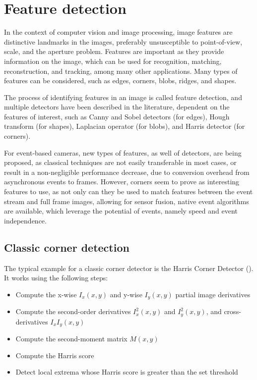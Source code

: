 \section{Feature detection}
\label{sec:sec2_feature_detection}

In the context of computer vision and image processing, image features are distinctive landmarks in the images, preferably unsusceptible to point-of-view, scale, and the aperture problem. Features are important as they provide information on the image, which can be used for recognition, matching, reconstruction, and tracking, among many other applications. Many types of features can be considered, such as edges, corners, blobs, ridges, and shapes.

The process of identifying features in an image is called feature detection, and multiple detectors have been described in the literature, dependent on the features of interest, such as Canny and Sobel detectors (for edges), Hough transform (for shapes), Laplacian operator (for blobs), and Harris detector (for corners).

For event-based cameras, new types of features, as well of detectors, are being proposed, as classical techniques are not easily transferable in most cases, or result in a non-negligible performance decrease, due to conversion overhead from asynchronous events to frames. However, corners seem to prove as interesting features to use, as not only can they be used to match features between the event stream and full frame images, allowing for sensor fusion, native event algorithms are available, which leverage the potential of events, namely speed and event independence.

\subsection{Classic corner detection}
\label{sec:sec2_classic_corner_detection}

The typical example for a classic corner detector is the Harris Corner Detector (\cite{harris1988combined}). It works using the following steps:

\begin{itemize}
    \item Compute the x-wise $I_x(x,y)$ and y-wise $I_y(x,y)$ partial image derivatives
    \item Compute the second-order derivatives $I_x^2(x,y)$  and $I_y^2(x,y)$, and cross-derivatives $I_x I_y(x,y)$
    \item Compute the second-moment matrix $M(x,y)$
    \item Compute the Harris score
    \item Detect local extrema whose Harris score is greater than the set threshold
\end{itemize}

